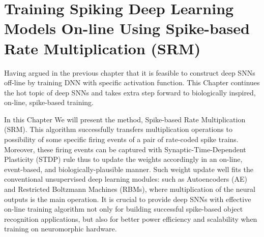 \chapter{Training Spiking Deep Learning Models On-line Using Spike-based Rate Multiplication (SRM)}
\label{cha:sdlm}
Having argued in the previous chapter that it is feasible to construct deep SNNs off-line by training DNN with specific activation function.
This Chapter continues the hot topic of deep SNNs and takes extra step forward to biologically inspired, on-line, spike-based training.

In this Chapter We will present the method, Spike-based Rate Multiplication (SRM).
This algorithm successfully transfers multiplication operations to possibility of some specific firing events of a pair of rate-coded spike trains.
Moreover, these firing events can be captured with Synaptic-Time-Dependent Plasticity (STDP) rule thus to update the weights accordingly in an on-line, event-based, and biologically-plausible manner.
Such weight update well fits the conventional unsupervised deep learning modules: such as Autoencoders (AE) and Restricted Boltzmann Machines (RBMs), where multiplication of the neural outputs is the main operation.
It is crucial to provide deep SNNs with effective on-line training algorithm not only for building successful spike-based object recognition applications, but also for better power efficiency and scalability when training on neuromorphic hardware.


